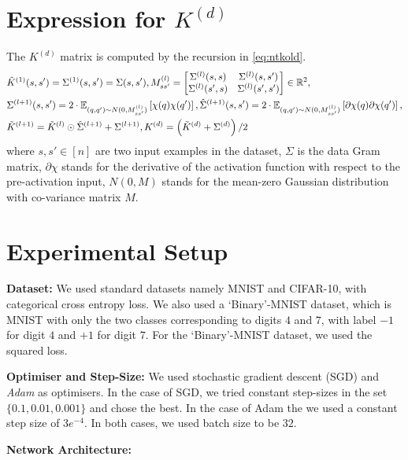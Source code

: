 \begin{appendix}
\section{Expression for $K^{(d)}$}\label{sec:kd}
The $K^{(d)}$ matrix is computed by the recursion in \eqref{eq:ntkold}.
\begin{align}\label{eq:ntkold}
&\tilde{K}^{(1)}(s,s')=\Sigma^{(1)}(s,s')=\Sigma(s,s'), M^{(l)}_{ss'}=\left[\begin{matrix}\Sigma^{(l)}(s,s) & \Sigma^{(l)}(s,s')\\ \Sigma^{(l)}(s',s) & \Sigma^{(l)}(s',s')\end{matrix}\right]\in \mathbb{R}^2,\nonumber\\
&\Sigma^{(l+1)}(s,s')= 2\cdot\mathbb{E}_{(q,q')\sim N(0,M_{ss'}^{(l)})} \left[\chi(q)\chi(q')\right], \hat{\Sigma}^{(l+1)}(s,s')= 2\cdot\mathbb{E}_{(q,q')\sim N(0,M_{ss'}^{(l)})}\left[\partial\chi(q)\partial{\chi}(q')\right],\nonumber\\
&\tilde{K}^{(l+1)}=\tilde{K}^{(l)}\odot \hat{\Sigma}^{(l+1)}+\Sigma^{(l+1)}, K^{(d)}=\left(\tilde{K}^{(d)}+\Sigma^{(d)}\right)/2
\end{align}
where $s,s'\in[n]$ are two input examples in the dataset, $\Sigma$ is the data Gram matrix, $\partial{\chi}$ stands for the derivative of the activation function with respect to the pre-activation input, $N(0,M)$ stands for the mean-zero Gaussian distribution with co-variance matrix $M$.

\section{Experimental Setup}\label{sec:expsetup}

\textbf{Dataset:} We used standard datasets namely MNIST and CIFAR-10, with categorical cross entropy loss. We also used a `Binary'-MNIST dataset, which is MNIST with only the two classes corresponding to digits $4$ and $7$, with label $-1$ for digit $4$ and $+1$ for digit $7$. For the `Binary'-MNIST dataset, we used the squared loss.

\textbf{Optimiser and Step-Size:} We used stochastic gradient descent (SGD) and \emph{Adam} as optimisers. In the case of SGD, we tried constant step-sizes in the set $\{0.1,0.01,0.001\}$ and chose the best. In the case of Adam the we used a constant step size of $3e^{-4}$. In both cases, we used batch size to be $32$.


\textbf{Network Architecture:}  


\end{appendix}
